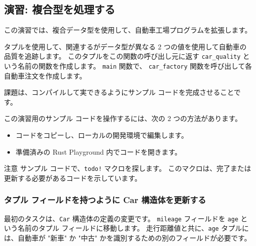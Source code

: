 \subsection{演習: 複合型を処理する}

この演習では、複合データ型を使用して、自動車工場プログラムを拡張します。

タプルを使用して、関連するがデータ型が異なる 2 つの値を使用して自動車の品質を追跡します。 このタプルをこの関数の呼び出し元に返す \texttt{car\_quality} という名前の関数を作成します。 \texttt{main} 関数で、 \texttt{car\_factory} 関数を呼び出して各自動車注文を作成します。

課題は、コンパイルして実できるようにサンプル コードを完成させることです。

この演習用のサンプル コードを操作するには、次の 2 つの方法があります。

\begin{itemize}
\item コードをコピーし、ローカルの開発環境で編集します。
\item 準備済みの Rust Playground 内でコードを開きます。
\end{itemize}

\begin{itembox}[l]{注意}
サンプル コードで、\texttt{todo!} マクロを探します。 このマクロは、完了または更新する必要があるコードを示しています。
\end{itembox}

\subsubsection{タプル フィールドを持つように Car 構造体を更新する}

最初のタスクは、\texttt{Car} 構造体の定義の変更です。 \texttt{mileage} フィールドを \texttt{age} という名前のタプル フィールドに移動します。 走行距離値と共に、\texttt{age} タプルには、自動車が "新車" か "中古" かを識別するための別のフィールドが必要です。

